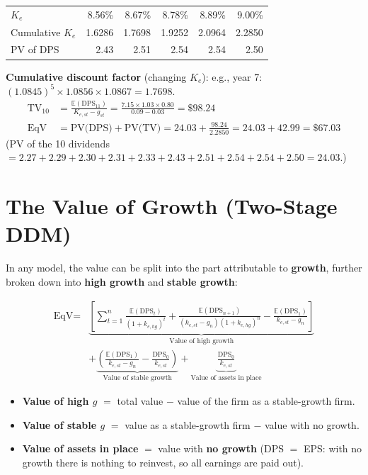 \begin{exbox}
\begin{center}
\begin{tabular}{@{}lrrrrr@{}}
$K_e$ & 8.56\% & 8.67\% & 8.78\% & 8.89\% & 9.00\%\\
Cumulative $K_e$ & 1.6286 & 1.7698 & 1.9252 & 2.0964 & 2.2850\\
PV of DPS & 2.43 & 2.51 & 2.54 & 2.54 & 2.50\\
\bottomrule
\end{tabular}
\end{center}
\textbf{Cumulative discount factor} (changing $K_e$): e.g., year 7: $(1.0845)^5\times1.0856\times1.0867=1.7698$.
\begin{align*}
\text{TV}_{10}&=\frac{\mathbb{E}(\text{DPS}_{11})}{K_{e,st}-g_{st}}=\frac{7.15\times1.03\times0.80}{0.09-0.03}=\mathbf{\$98.24}\\
\text{EqV}&=\text{PV(DPS)}+\text{PV(TV)}=24.03+\frac{98.24}{2.2850}=24.03+42.99=\mathbf{\$67.03}
\end{align*}
(PV of the 10 dividends $=2.27+2.29+2.30+2.31+2.33+2.43+2.51+2.54+2.54+2.50=24.03$.)
\end{exbox}

\section{The Value of Growth (Two-Stage DDM)}

In any model, the value can be split into the part attributable to \textbf{growth}, further broken down into \textbf{high growth} and \textbf{stable growth}:
\begin{keybox}
\begin{align*}
\text{EqV}=&\underbrace{\left[\sum_{t=1}^{n}\frac{\mathbb{E}(\text{DPS}_t)}{(1+k_{e,hg})^t}+\frac{\mathbb{E}(\text{DPS}_{n+1})}{(k_{e,st}-g_n)(1+k_{e,hg})^n}-\frac{\mathbb{E}(\text{DPS}_1)}{k_{e,st}-g_n}\right]}_{\text{Value of high growth}}\\
&+\underbrace{\left(\frac{\mathbb{E}(\text{DPS}_1)}{k_{e,st}-g_n}-\frac{\text{DPS}_0}{k_{e,st}}\right)}_{\text{Value of stable growth}}+\underbrace{\frac{\text{DPS}_0}{k_{e,st}}}_{\text{Value of assets in place}}
\end{align*}
\begin{itemize}[leftmargin=*]
  \item \textbf{Value of high $g$} $=$ total value $-$ value of the firm as a stable-growth firm.
  \item \textbf{Value of stable $g$} $=$ value as a stable-growth firm $-$ value with no growth.
  \item \textbf{Value of assets in place} $=$ value with \textbf{no growth} (DPS $=$ EPS: with no growth there is nothing to reinvest, so all earnings are paid out).
\end{itemize}
\end{keybox}

